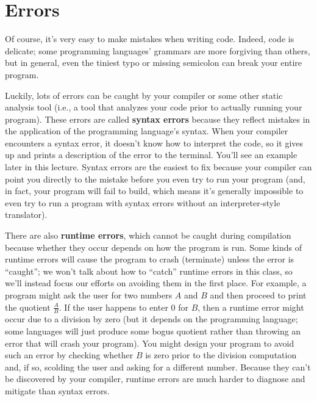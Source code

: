 \documentclass{article}
\begin{document}
\section{Errors}

Of course, it's very easy to make mistakes when writing code. Indeed, code is delicate; some programming languages' grammars are more forgiving than others, but in general, even the tiniest typo or missing semicolon can break your entire program.

Luckily, lots of errors can be caught by your compiler or some other static analysis tool (i.e., a tool that analyzes your code prior to actually running your program). These errors are called \textbf{syntax errors} because they reflect mistakes in the application of the programming language's syntax. When your compiler encounters a syntax error, it doesn't know how to interpret the code, so it gives up and prints a description of the error to the terminal. You'll see an example later in this lecture. Syntax errors are the easiest to fix because your compiler can point you directly to the mistake before you even try to run your program (and, in fact, your program will fail to build, which means it's generally impossible to even try to run a program with syntax errors without an interpreter-style translator).

There are also \textbf{runtime errors}, which cannot be caught during compilation because whether they occur depends on how the program is run. Some kinds of runtime errors will cause the program to crash (terminate) unless the error is ``caught''; we won't talk about how to ``catch'' runtime errors in this class, so we'll instead focus our efforts on avoiding them in the first place. For example, a program might ask the user for two numbers $A$ and $B$ and then proceed to print the quotient $\frac{A}{B}$. If the user happens to enter $0$ for $B$, then a runtime error might occur due to a division by zero (but it depends on the programming language; some languages will just produce some bogus quotient rather than throwing an error that will crash your program). You might design your program to avoid such an error by checking whether $B$ is zero prior to the division computation and, if so, scolding the user and asking for a different number. Because they can't be discovered by your compiler, runtime errors are much harder to diagnose and mitigate than syntax errors.
\end{document}
